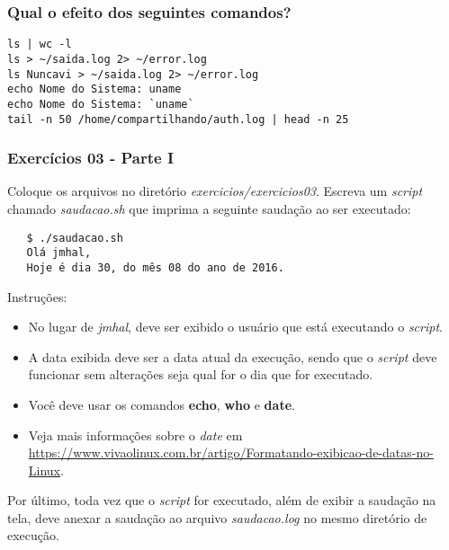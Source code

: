 \documentclass{beamer}
\begin{document}
   \begin{frame}[fragile]
      \frametitle{Qual o efeito dos seguintes comandos?}
      \begin{verbatim}
ls | wc -l 
ls > ~/saida.log 2> ~/error.log 
ls Nuncavi > ~/saida.log 2> ~/error.log
echo Nome do Sistema: uname  
echo Nome do Sistema: `uname`
tail -n 50 /home/compartilhando/auth.log | head -n 25  
       \end{verbatim}
\end{frame}

\begin{frame}[fragile]
   \frametitle{Exercícios 03 - Parte I}
   Coloque os arquivos no diretório \textit{exercicios/exercicios03}. Escreva um \textit{script} chamado \textit{saudacao.sh} que imprima
   a seguinte saudação ao ser executado:
   \begin{verbatim}
   $ ./saudacao.sh
   Olá jmhal,
   Hoje é dia 30, do mês 08 do ano de 2016.
   \end{verbatim}
   Instruções:
   \footnotesize
   \begin{itemize}
      \item No lugar de \textit{jmhal}, deve ser exibido o usuário que está executando o \textit{script}.
      \item A data exibida deve ser a data atual da execução, sendo que o \textit{script} deve funcionar sem alterações seja qual for o dia que for executado.
      \item Você deve usar os comandos \textbf{echo}, \textbf{who} e \textbf{date}. 
      \item Veja mais informações sobre o \textit{date} em \url{https://www.vivaolinux.com.br/artigo/Formatando-exibicao-de-datas-no-Linux}.
   \end{itemize}
   \normalsize
   Por último, toda vez que o \textit{script} for executado, além de exibir a saudação na tela, deve anexar
   a saudação ao arquivo \textit{saudacao.log} no mesmo diretório de execução.
\end{frame}

\end{document}
